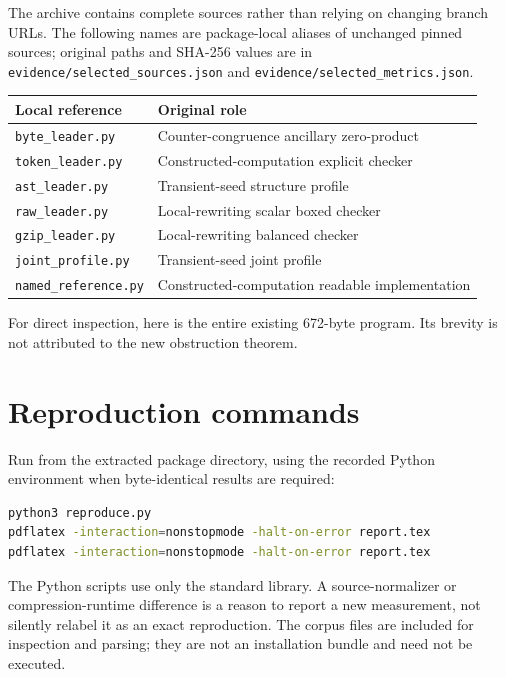 \documentclass[11pt]{article}
\newcommand{\file}[1]{\texttt{\nolinkurl{#1}}}
\begin{document}
The archive contains complete sources rather than relying on changing
branch URLs. The following names are package-local aliases of unchanged
pinned sources; original paths and SHA-256 values are in
\file{evidence/selected_sources.json} and
\file{evidence/selected_metrics.json}.

\begin{center}\small
\begin{tabular}{ll}
\toprule
Local reference & Original role\\
\midrule
\file{byte_leader.py} & Counter-congruence ancillary zero-product\\
\file{token_leader.py} & Constructed-computation explicit checker\\
\file{ast_leader.py} & Transient-seed structure profile\\
\file{raw_leader.py} & Local-rewriting scalar boxed checker\\
\file{gzip_leader.py} & Local-rewriting balanced checker\\
\file{joint_profile.py} & Transient-seed joint profile\\
\file{named_reference.py} & Constructed-computation readable implementation\\
\bottomrule
\end{tabular}
\end{center}

For direct inspection, here is the entire existing 672-byte program.
Its brevity is not attributed to the new obstruction theorem.


\section{Reproduction commands}

Run from the extracted package directory, using the recorded Python
environment when byte-identical results are required:
\begin{lstlisting}[language=bash]
python3 reproduce.py
pdflatex -interaction=nonstopmode -halt-on-error report.tex
pdflatex -interaction=nonstopmode -halt-on-error report.tex
\end{lstlisting}
The Python scripts use only the standard library. A source-normalizer or
compression-runtime difference is a reason to report a new measurement,
not silently relabel it as an exact reproduction. The corpus files are
included for inspection and parsing; they are not an installation bundle
and need not be executed.
\end{document}
